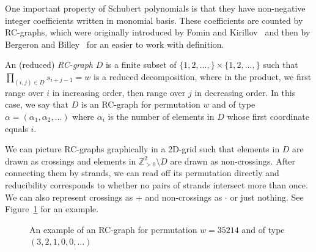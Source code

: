 \documentclass[ALCO,ThmDefs,Unicode,epreuves]{cedram}
\newcommand{\Z}{\mathbb{Z}}
\begin{document}
One important property of Schubert polynomials is that they have non-negative integer coefficients written in monomial basis. These coefficients are counted by RC-graphs, which were originally introduced by Fomin and Kirillov~\cite{fomin1993yang} and then by Bergeron and Billey~\cite{bergeron1993rc} for an easier to work with definition.
\begin{defi}[RC-Graphs]
An (reduced) \emph{RC-graph} $D$ is a finite subset of $\{1,2,\ldots,\}\times\{1,2,\ldots,\}$ such that $\prod_{(i,j)\in D}s_{i+j-1}=w$ is a reduced decomposition, where in the product, we first range over $i$ in increasing order, then range over $j$ in decreasing order. In this case, we say that $D$ is an RC-graph for permutation $w$ and of type $\alpha=(\alpha_1,\alpha_2,\ldots)$ where $\alpha_i$ is the number of elements in $D$ whose first coordinate equals $i$. 
\end{defi}
We can picture RC-graphs graphically in a 2D-grid such that elements in $D$ are drawn as crossings and elements in $\Z_{>0}^2\setminus D$ are drawn as non-crossings. After connecting them by strands, we can read off its permutation directly and reducibility corresponds to whether no pairs of strands intersect more than once. We can also represent crossings as $+$ and non-crossings as $\cdot$ or just nothing. See Figure~\ref{fig:rcex} for an example.
\begin{figure}[h!]
\centering
{}
\caption{An example of an RC-graph for permutation $w=35214$ and of type $(3,2,1,0,0,\ldots)$}
\label{fig:rcex}
\end{figure}
\end{document}
